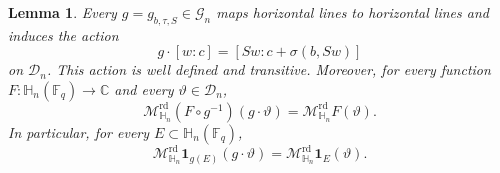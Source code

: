 \documentclass[11pt,letterpaper]{amsart}
\numberwithin{equation}{section}
\newtheorem{lemma}[lemma]{Lemma}
\theoremstyle{definition}
\theoremstyle{remark}
\newcommand{\Fq}{\mathbb F_q}
\newcommand{\C}{\mathbb C}
\newcommand{\HH}{\mathbb H}
\newcommand{\Dn}{\mathcal D_n}
\newcommand{\Mrd}{\mathcal M^{\mathrm{rd}}_{\HH_n}}
\newcommand{\one}{\mathbf 1}
\begin{document}
\begin{lemma}
\label{lem:symmetry-action}
Every $g=g_{b,\tau,S}\in\mathcal G_n$ maps horizontal lines to
horizontal lines and induces the action
\begin{equation}\label{eq:direction-action}
 g\cdot[w:c]=[Sw:c+\sigma(b,Sw)]
\end{equation}
on $\Dn$. This action is well defined and transitive. Moreover, for
every function $F:\HH_n(\Fq)\to\C$ and every $\vartheta\in\Dn$,
\begin{equation}\label{eq:maximal-covariance}
 \Mrd(F\circ g^{-1})(g\cdot\vartheta)=\Mrd F(\vartheta).
\end{equation}
In particular, for every $E\subset\HH_n(\Fq)$,
\[
 \Mrd\one_{g(E)}(g\cdot\vartheta)=\Mrd\one_E(\vartheta).
\]
\end{lemma}
\end{document}
